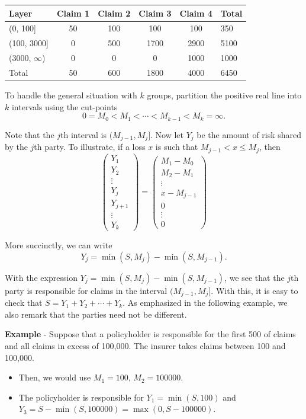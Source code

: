 \documentclass[]{book}
\theoremstyle{definition}
\theoremstyle{definition}
\theoremstyle{definition}
\theoremstyle{remark}
\begin{document}
\begin{longtable}[]{@{}lccccl@{}}
\toprule
Layer & Claim 1 & Claim 2 & Claim 3 & Claim 4 & Total\tabularnewline
\midrule
\endhead
(0, 100{]} & 50 & 100 & 100 & 100 & 350\tabularnewline
(100, 3000{]} & 0 & 500 & 1700 & 2900 & 5100\tabularnewline
(3000, \(\infty\)) & 0 & 0 & 0 & 1000 & 1000\tabularnewline
Total & 50 & 600 & 1800 & 4000 & 6450\tabularnewline
\bottomrule
\end{longtable}

To handle the general situation with \(k\) groups, partition the
positive real line into \(k\) intervals using the cut-points
\[0 = M_0 < M_1 < \cdots < M_{k-1} < M_k = \infty.\]

Note that the \(j\)th interval is \((M_{j-1}, M_j]\). Now let \(Y_j\) be
the amount of risk shared by the \(j\)th party. To illustrate, if a loss
\(x\) is such that \(M_{j-1} <x \le M_j\), then \[\left(\begin{array}{c}
    Y_1\\ Y_2 \\ \vdots \\ Y_j \\Y_{j+1} \\ \vdots \\Y_k
    \end{array}\right)
    =\left(\begin{array}{c}
    M_1-M_0 \\ M_2-M_1  \\ \vdots \\ x-M_{j-1}  \\ 0 \\ \vdots \\0
    \end{array}\right)\]

More succinctly, we can write \[Y_j = \min(S,M_j) - \min(S,M_{j-1}) .\]

With the expression \(Y_j = \min(S,M_j) - \min(S,M_{j-1})\), we see that
the \(j\)th party is responsible for claims in the interval
\((M_{j-1}, M_j].\) With this, it is easy to check that
\(S = Y_1 + Y_2 + \cdots + Y_k.\) As emphasized in the following
example, we also remark that the parties need not be different.

\textbf{Example} - Suppose that a policyholder is responsible for the
first 500 of claims and all claims in excess of 100,000. The insurer
takes claims between 100 and 100,000.

\begin{itemize}
\item
  Then, we would use \(M_1 = 100\), \(M_2 =100000\).
\item
  The policyholder is responsible for \(Y_1 =\min(S,100)\) and
  \(Y_3 = S - \min(S,100000) = \max(0, S-100000)\).
\end{itemize}
\end{document}
